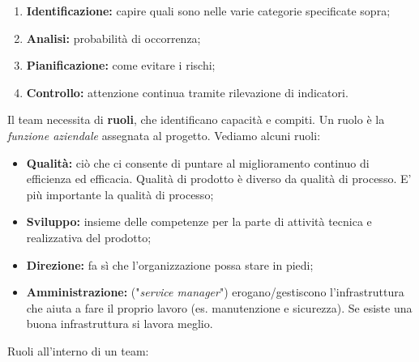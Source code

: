 \begin{enumerate}

	\item \textbf{Identificazione:} capire quali sono nelle varie categorie specificate sopra;
	
	\item \textbf{Analisi:} probabilità di occorrenza;
	
	\item \textbf{Pianificazione:} come evitare i rischi;
	
	\item \textbf{Controllo:} attenzione continua tramite rilevazione di indicatori.

\end{enumerate}

Il team necessita di \textbf{ruoli}, che identificano capacità e compiti. Un ruolo è la \textit{funzione aziendale} assegnata al progetto. Vediamo alcuni ruoli:

\begin{itemize}

	\item \textbf{Qualità:} ciò che ci consente di puntare al miglioramento continuo di efficienza ed efficacia. Qualità di prodotto è diverso da qualità di processo. E' più importante la qualità di processo;
	
	\item \textbf{Sviluppo:} insieme delle competenze per la parte di attività tecnica e realizzativa del prodotto;
	
	\item \textbf{Direzione:} fa sì che l'organizzazione possa stare in piedi;
	
	\item \textbf{Amministrazione:} ("\textit{service manager}") erogano/gestiscono l'infrastruttura che aiuta a fare il proprio lavoro (es. manutenzione e sicurezza). Se esiste una buona infrastruttura si lavora meglio.

\end{itemize}

Ruoli all'interno di un team:


